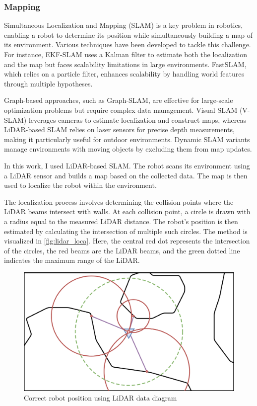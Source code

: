 \documentclass[../main.tex]{subfiles}
\begin{document}
\subsubsection{Mapping}

Simultaneous Localization and Mapping (SLAM) is a key problem in robotics, enabling a robot to determine its position while simultaneously building a map of its environment. Various techniques have been developed to tackle this challenge. For instance, EKF-SLAM uses a Kalman filter to estimate both the localization and the map but faces scalability limitations in large environments. FastSLAM, which relies on a particle filter, enhances scalability by handling world features through multiple hypotheses.  

\vspace{1em}

Graph-based approaches, such as Graph-SLAM, are effective for large-scale optimization problems but require complex data management. Visual SLAM (V-SLAM) leverages cameras to estimate localization and construct maps, whereas LiDAR-based SLAM relies on laser sensors for precise depth measurements, making it particularly useful for outdoor environments. Dynamic SLAM variants manage environments with moving objects by excluding them from map updates.\cite{ding_2024}

\vspace{1em}

In this work, I used LiDAR-based SLAM. The robot scans its environment using a LiDAR sensor and builds a map based on the collected data. The map is then used to localize the robot within the environment.

\vspace{1em}

The localization process involves determining the collision points where the LiDAR beams intersect with walls. At each collision point, a circle is drawn with a radius equal to the measured LiDAR distance. The robot's position is then estimated by calculating the intersection of multiple such circles. 
The method is visualized in \autoref{fig:lidar_loca}. Here, the central red dot represents the intersection of the circles, the red beams are the LiDAR beams, and the green dotted line indicates the maximum range of the LiDAR.

\begin{figure}[H]
	\centering
	\includegraphics[width=0.6\linewidth]{IMAGES/part5/lidar_correct_pos.png}
	\caption{Correct robot position using LiDAR data diagram}
	\label{fig:lidar_loca}
\end{figure}
\end{document}
